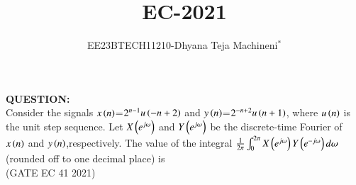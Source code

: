 \documentclass[journal,12pt,twocolumn]{IEEEtran}
\theoremstyle{remark}
\begin{document}

\vspace{3cm}
\title{\textbf{EC-2021}}
\author{EE23BTECH11210-Dhyana Teja Machineni$^{*}$%
}
\maketitle
\newpage
\bigskip

\textbf{QUESTION:}\\
Consider the signals $x\left(n\right)$=$2^{n-1} u\left( -n+2\right)$ and $y\left(n\right)$=$2^{-n+2}u\left( n+1\right)$, where $u\left(n\right)$ is the unit step sequence. Let $X\left(e^{j\omega}\right)$ and $Y\left(e^{j\omega}\right)$ be the discrete-time Fourier of $x\left(n\right)$ and $y\left(n\right)$,respectively. The value of the integral $\frac{1}{2\pi}\int_{0}^{2\pi} X\left(e^{j\omega}\right) Y\left(e^{-j\omega}\right) d \omega$
(rounded off to one decimal place) is \underline{{\hspace{1.5in}}}\\
\hfill{(GATE EC 41 2021)}\\

\solution\\
\end{document}
